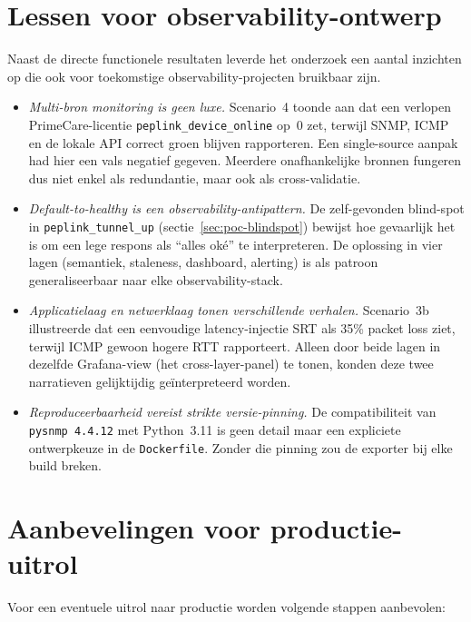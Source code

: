 \section{Lessen voor observability-ontwerp}
\label{sec:poc-lessen}

Naast de directe functionele resultaten leverde het onderzoek een aantal inzichten op die ook voor toekomstige observability-projecten bruikbaar zijn.

\begin{itemize}
  \item \emph{Multi-bron monitoring is geen luxe.} Scenario~4 toonde aan dat een verlopen PrimeCare-licentie \texttt{peplink\_device\_online} op~0 zet, terwijl SNMP, ICMP en de lokale API correct groen blijven rapporteren. Een single-source aanpak had hier een vals negatief gegeven. Meerdere onafhankelijke bronnen fungeren dus niet enkel als redundantie, maar ook als cross-validatie.
  \item \emph{Default-to-healthy is een observability-antipattern.} De zelf-gevonden blind-spot in \texttt{peplink\_tunnel\_up} (sectie~\ref{sec:poc-blindspot}) bewijst hoe gevaarlijk het is om een lege respons als ``alles oké'' te interpreteren. De oplossing in vier lagen (semantiek, staleness, dashboard, alerting) is als patroon generaliseerbaar naar elke observability-stack.
  \item \emph{Applicatielaag en netwerklaag tonen verschillende verhalen.} Scenario~3b illustreerde dat een eenvoudige latency-injectie SRT als 35\% packet loss ziet, terwijl ICMP gewoon hogere RTT rapporteert. Alleen door beide lagen in dezelfde Grafana-view (het cross-layer-panel) te tonen, konden deze twee narratieven gelijktijdig geïnterpreteerd worden.
  \item \emph{Reproduceerbaarheid vereist strikte versie-pinning.} De compatibiliteit van \texttt{pysnmp 4.4.12} met Python~3.11 is geen detail maar een expliciete ontwerpkeuze in de \texttt{Dockerfile}. Zonder die pinning zou de exporter bij elke build breken.
\end{itemize}

\section{Aanbevelingen voor productie-uitrol}
\label{sec:poc-aanbevelingen}

Voor een eventuele uitrol naar productie worden volgende stappen aanbevolen:

